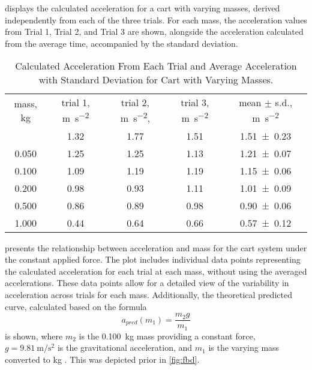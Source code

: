 ﻿\documentclass[reprint,amsmath,amssymb,aps]{revtex4-2}
\begin{document}
 displays the calculated acceleration for a cart with varying masses, derived independently from each of the three trials. For each mass, the acceleration values from Trial 1, Trial 2, and Trial 3 are shown, alongside the acceleration calculated from the average time, accompanied by the standard deviation. 
\begin{table}
\caption{\label{tab:fig4}Calculated Acceleration From Each Trial and Average Acceleration with Standard Deviation for Cart with Varying Masses.}
\begin{center}
\begin{ruledtabular}
\begin{tabular}{ccccc}
mass, \unit{\kilo\gram} & trial 1, \unit{\meter\per\second\squared} & trial 2, \unit{\meter\per\second\squared}, & trial 3, \unit{\meter\per\second\squared} & mean $\pm$ s.d., \unit{\meter\per\second\squared} \\
\colrule
0.020 & 1.32 & 1.77 & 1.51 & \num{1.51\pm0.23} \\
0.050 & 1.25 & 1.25 & 1.13 & \num{1.21\pm0.07} \\
0.100 & 1.09 & 1.19 & 1.19 & \num{1.15\pm0.06} \\
0.200 & 0.98 & 0.93 & 1.11 & \num{1.01\pm0.09} \\
0.500 & 0.86 & 0.89 & 0.98 & \num{0.90\pm0.06} \\
1.000 & 0.44 & 0.64 & 0.66 & \num{0.57\pm0.12} \\
\end{tabular}
\end{ruledtabular}
\end{center}
\end{table}

 presents the relationship between acceleration and mass for the cart system under the constant applied force. The plot includes individual data points representing the calculated acceleration for each trial at each mass, without using the averaged accelerations. These data points allow for a detailed view of the variability in acceleration across trials for each mass. Additionally, the theoretical predicted curve, calculated based on the formula  
\begin{equation}
a_{pred}(m_1) = \dfrac{m_2 g}{m_1}
\end{equation}
is shown, where $m_2$ is the \qty{0.100}{\kilo\gram} mass providing a constant force, $g=\qty{9.81}{\meter\per\second\squared}$ is the gravitational acceleration, and $m_1$ is the varying mass converted to kg \cite{knight2017physics}. This was depicted prior in \cref{fig:fbd}.
\end{document}
